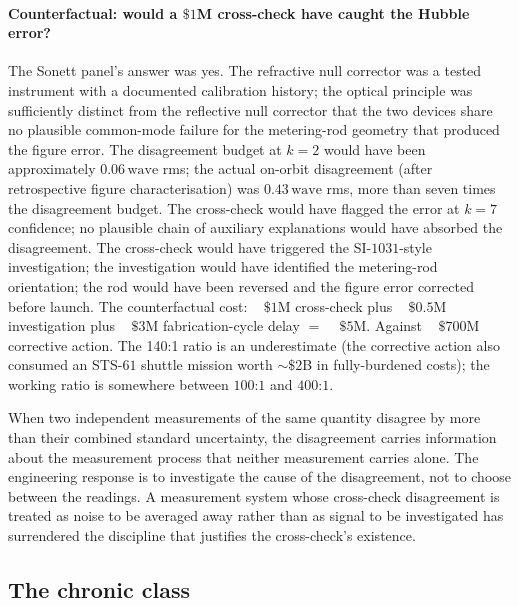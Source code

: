 \paragraph{Counterfactual: would a $\$1$M cross-check have
caught the Hubble error?} The Sonett panel's answer was yes.
The refractive null corrector was a tested instrument with a
documented calibration history; the optical principle was
sufficiently distinct from the reflective null corrector that
the two devices share no plausible common-mode failure for
the metering-rod geometry that produced the figure error.
The disagreement budget at $k = 2$ would have been
approximately $0.06\,\text{wave}$ rms; the actual on-orbit
disagreement (after retrospective figure characterisation)
was $0.43\,\text{wave}$ rms, more than seven times the
disagreement budget. The cross-check would have flagged the
error at $k = 7$ confidence; no plausible chain of
auxiliary explanations would have absorbed the disagreement.
The cross-check would have triggered the SI-$1031$-style
investigation; the investigation would have identified the
metering-rod orientation; the rod would have been reversed
and the figure error corrected before launch. The
counterfactual cost: ~ $\$1$M cross-check plus ~ $\$0.5$M
investigation plus ~ $\$3$M fabrication-cycle delay $=$
~ $\$5$M. Against ~ $\$700$M corrective action. The 140:1
ratio is an underestimate (the corrective action also
consumed an STS-$61$ shuttle mission worth $\sim \$2$B in
fully-burdened costs); the working ratio is somewhere
between $100$:$1$ and $400$:$1$.

\begin{principle}
When two independent measurements of the same quantity
disagree by more than their combined standard uncertainty,
the disagreement carries information about the measurement
process that neither measurement carries alone. The
engineering response is to investigate the cause of the
disagreement, not to choose between the readings. A
measurement system whose cross-check disagreement is treated
as noise to be averaged away rather than as signal to be
investigated has surrendered the discipline that justifies
the cross-check's existence.
\end{principle}

\subsection{The chronic class}

